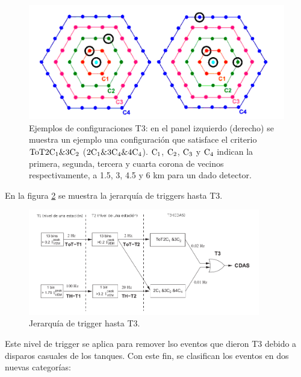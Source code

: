 			\begin{figure}[h!]
				\begin{center}
				\includegraphics[width=\textwidth]{fig/detectorAuger/coronas}
				\caption{\label{fig:coronas} Ejemplos de configuraciones T3: en el panel izquierdo (derecho) se muestra un ejemplo una configuraci\'on que satisface el criterio $\rm ToT2C_1\&3C_2$ ($\rm 2C_1\&3C_4\&4C_4$). $\rm C_1$, $\rm C_2$, $\rm C_3$ y $\rm C_4$ indican la primera, segunda, tercera y cuarta corona de vecinos respectivamente, a 1.5, 3, 4.5 y 6 km para un dado detector.}
				\end{center}
			\end{figure}
			
			En la figura \ref{fig:diagtrig} se muestra la jerarqu\'ia de triggers hasta T3.
			\vspace{0.5cm}
			
			\begin{figure}[h!]
				\begin{center}
				\includegraphics[width=0.9\textwidth]{fig/detectorAuger/Trigger_2}
				\caption{\label{fig:diagtrig} Jerarqu\'ia de trigger hasta T3.}
				\end{center}
			\end{figure}
			
			 Este nivel de trigger se aplica para remover lso eventos que dieron T3 debido a disparos casuales de los tanques.
			Con este fin, se clasifican los eventos en dos nuevas categor\'ias:
			
